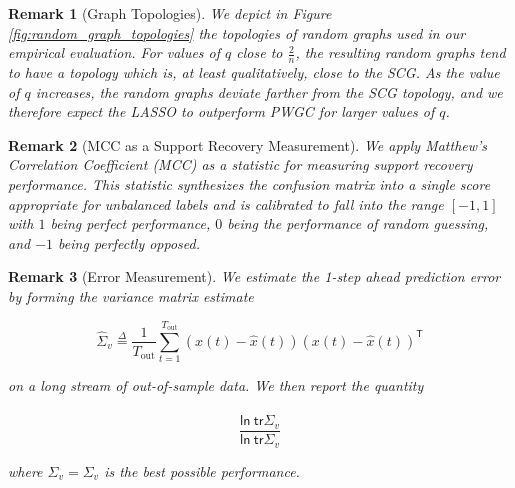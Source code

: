\documentclass{statsoc}
\newtheorem{remark}{Remark}
\def\defeq{\overset{\Delta}{=}}  %
\def\ln{\mathsf{ln\ }}  %
\def\tr{\mathsf{tr }}  %
\def\T{\mathsf{T}}  %
\begin{document}
\begin{remark}[Graph Topologies]
  We depict in Figure \ref{fig:random_graph_topologies} the topologies
  of random graphs used in our empirical evaluation.  For values of
  $q$ close to $\frac{2}{n}$, the resulting random graphs tend to have
  a topology which is, at least qualitatively, close to the SCG.  As
  the value of $q$ increases, the random graphs deviate farther from
  the SCG topology, and we therefore expect the LASSO to outperform
  PWGC for larger values of $q$.
\end{remark}

\begin{remark}[MCC as a Support Recovery Measurement]
  We apply Matthew's Correlation Coefficient (MCC)
  \cite{matthews1975comparison} as a statistic for measuring support
  recovery performance.  This statistic synthesizes the confusion
  matrix into a single score appropriate for unbalanced labels and is
  calibrated to fall into the range $[-1, 1]$ with $1$ being perfect
  performance, $0$ being the performance of random guessing, and $-1$
  being perfectly opposed.
\end{remark}

\begin{remark}[Error Measurement]
  We estimate the 1-step ahead prediction error by forming the variance matrix estimate

  \begin{equation*}
    \widehat{\Sigma}_v \defeq \frac{1}{T_{\text{out}}} \sum_{t = 1}^{T_{\text{out}}} (x(t) - \widehat{x}(t))(x(t) - \widehat{x}(t))^\T
  \end{equation*}

  on a long stream of out-of-sample data.  We then report the quantity

  \begin{equation*}
    \frac{\ln \tr \widehat{\Sigma}_v}{\ln \tr \Sigma_v}
  \end{equation*}

  where $\widehat{\Sigma}_v = \Sigma_v$ is the best possible performance.
\end{remark}
\end{document}
